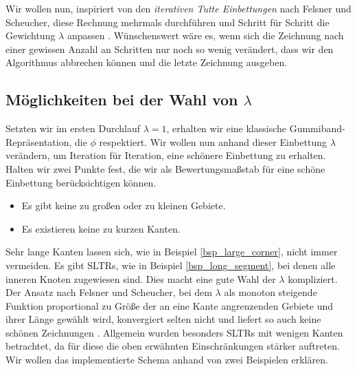 Wir wollen nun, inspiriert von den \textit{iterativen Tutte Einbettungen} nach Felsner und Scheucher, diese Rechnung mehrmals durchführen und Schritt für Schritt die Gewichtung $\lambda$ anpassen \cite{fs17}. Wünschenswert wäre es, wenn sich die Zeichnung nach einer gewissen Anzahl an Schritten nur noch so wenig verändert, dass wir den Algorithmus abbrechen können und die letzte Zeichnung ausgeben.

\subsection{Möglichkeiten bei der Wahl von $\lambda$}

Setzten wir im ersten Durchlauf $\lambda = 1$, erhalten wir eine klassische Gummiband-Repräsentation, die $\phi$ respektiert. Wir wollen nun anhand dieser Einbettung $\lambda$ verändern, um Iteration für Iteration, eine \glqq schönere\grqq{ } Einbettung zu erhalten. Halten wir zwei Punkte fest, die wir als Bewertungsmaßstab für eine schöne Einbettung berücksichtigen können.

\begin{itemize}
\item Es gibt keine zu großen oder zu kleinen Gebiete.
\item Es existieren keine zu kurzen Kanten.
\end{itemize}

Sehr lange Kanten lassen sich, wie in Beispiel \ref{bsp_large_corner}, nicht immer vermeiden. Es gibt SLTRs, wie in Beispiel \ref{bsp_long_segment}, bei denen alle inneren Knoten zugewiesen sind. Dies macht eine gute Wahl der $\lambda$ kompliziert. Der Ansatz nach Felsner und Scheucher, bei dem $\lambda$ als monoton steigende Funktion proportional zu Größe der an eine Kante angrenzenden Gebiete und ihrer Länge gewählt wird, konvergiert selten nicht und liefert so auch keine schönen Zeichnungen \cite{fs17}. Allgemein wurden besonders SLTRs mit wenigen Kanten betrachtet, da für diese die oben erwähnten Einschränkungen stärker auftreten. Wir wollen das implementierte  Schema anhand von zwei Beispielen erklären.

